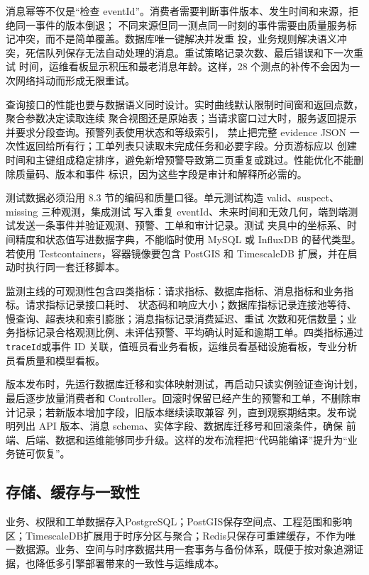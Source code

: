 消息幂等不仅是“检查 eventId”。消费者需要判断事件版本、发生时间和来源，拒绝同一事件的版本倒退；
不同来源但同一测点同一时刻的事件需要由质量服务标记冲突，而不是简单覆盖。数据库唯一键解决并发重
投，业务规则解决语义冲突，死信队列保存无法自动处理的消息。重试策略记录次数、最后错误和下一次重试
时间，运维看板显示积压和最老消息年龄。这样，28 个测点的补传不会因为一次网络抖动而形成无限重试。

查询接口的性能也要与数据语义同时设计。实时曲线默认限制时间窗和返回点数，聚合参数决定读取连续
聚合视图还是原始表；当请求窗口过大时，服务返回提示并要求分段查询。预警列表使用状态和等级索引，
禁止把完整 evidence JSON 一次性返回给所有行；工单列表只读取未完成任务和必要字段。分页游标应以
创建时间和主键组成稳定排序，避免新增预警导致第二页重复或跳过。性能优化不能删除质量码、版本和事件
标识，因为这些字段是审计和解释所必需的。

测试数据必须沿用 8.3 节的编码和质量口径。单元测试构造 valid、suspect、missing 三种观测，集成测试
写入重复 eventId、未来时间和无效几何，端到端测试发送一条事件并验证观测、预警、工单和审计记录。测试
夹具中的坐标系、时间精度和状态值写进数据字典，不能临时使用 MySQL 或 InfluxDB 的替代类型。若使用
Testcontainers，容器镜像要包含 PostGIS 和 TimescaleDB 扩展，并在启动时执行同一套迁移脚本。

监测主线的可观测性包含四类指标：请求指标、数据库指标、消息指标和业务指标。请求指标记录接口耗时、
状态码和响应大小；数据库指标记录连接池等待、慢查询、超表块和索引膨胀；消息指标记录消费延迟、重试
次数和死信数量；业务指标记录合格观测比例、未评估预警、平均确认时延和逾期工单。四类指标通过
\texttt{traceId}或事件 ID 关联，值班员看业务看板，运维员看基础设施看板，专业分析员看质量和模型看板。

版本发布时，先运行数据库迁移和实体映射测试，再启动只读实例验证查询计划，最后逐步放量消费者和
Controller。回滚时保留已经产生的预警和工单，不删除审计记录；若新版本增加字段，旧版本继续读取兼容
列，直到观察期结束。发布说明列出 API 版本、消息 schema、实体字段、数据库迁移号和回滚条件，确保
前端、后端、数据和运维能够同步升级。这样的发布流程把“代码能编译”提升为“业务链可恢复”。

\subsection{存储、缓存与一致性}

业务、权限和工单数据存入PostgreSQL；PostGIS保存空间点、工程范围和影响区；TimescaleDB扩展用于时序分区与聚合；Redis只保存可重建缓存，不作为唯一数据源。业务、空间与时序数据共用一套事务与备份体系，既便于按对象追溯证据，也降低多引擎部署带来的一致性与运维成本。

